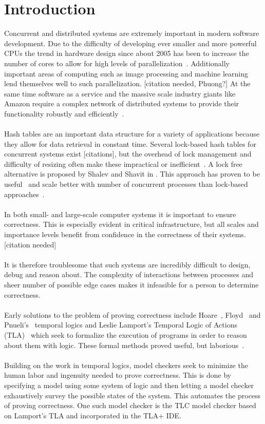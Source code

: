 \documentclass{uit-thesis}
\begin{document}
\chapter{Introduction}
Concurrent and distributed systems are extremely important in modern software development. Due to the difficulty of developing ever smaller and more powerful CPUs the trend in hardware design since about 2005 has been to increase the number of cores to allow for high levels of parallelization~\cite{Tanenbaum2014}. Additionally important areas of computing such as image processing and machine learning lend themselves well to such parallelization. [citation needed, Phuong?] At the same time software as a service and the massive scale industry giants like Amazon require a complex network of distributed systems to provide their functionality robustly and efficiently~\cite{Amazon2015}.
\\\\
Hash tables are an important data structure for a variety of applications because they allow for data retrieval in constant time. Several lock-based hash tables for concurrent systems exist [citations], but the overhead of lock management and difficulty of resizing often make these impractical or inefficient~\cite{Shalev2006}. A lock free alternative is proposed by Shalev and Shavit in \cite{Shalev2006}. This approach has proven to be useful~\cite{lock-free-structures2013} and scale better with number of concurrent processes than lock-based approaches~\cite{Duarte-Haskell2016}.
\\\\
In both small- and large-scale computer systems it is important to ensure correctness. This is especially evident in critical infrastructure, but all scales and importance levels benefit from confidence in the correctness of their systems. [citation needed]
\\\\
It is therefore troublesome that such systems are incredibly difficult to design, debug and reason about. The complexity of interactions between processes and sheer number of possible edge cases makes it infeasible for a person to determine correctness.
\\\\
Early solutions to the problem of proving correctness include Hoare~\cite{Hoare1969}, Floyd~\cite{Floyd1967} and Pnueli's~\cite{Pnueli1977} temporal logics and Leslie Lamport's Temporal Logic of Actions (TLA)~\cite{Lamport1977} which seek to formalize the execution of programs in order to reason about them with logic. These formal methods proved useful, but laborious~\cite{Clarke2009}.
\\\\
Building on the work in temporal logics, model checkers seek to minimize the human labor and ingenuity needed to prove correctness. This is done by specifying a model using some system of logic and then letting a model checker exhaustively survey the possible states of the system. This automates the process of proving correctness. One such model checker is the TLC model checker based on Lamport's TLA and incorporated in the TLA+ IDE.
\end{document}
